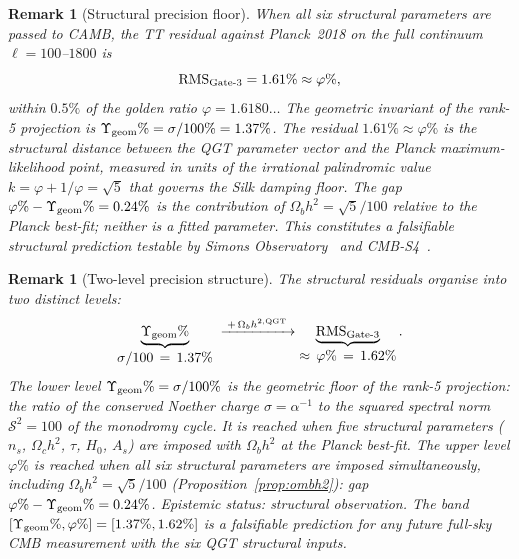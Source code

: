 \documentclass[twocolumn,10pt]{article}
\newcommand{\vp}{\varphi}
\newtheorem{remark}[theorem]{Remark}
\begin{document}
\begin{remark}[Structural precision floor]
\label{rem:rms_upsilon}
When all six structural parameters are passed to CAMB, the TT
residual against Planck~2018 on the full continuum $\ell=100$--$1800$ is
\begin{equation}
  \mathrm{RMS}_{\rm Gate\text{-}3} = 1.61\%
  \approx \vp\%,
  \label{eq:rms_upsilon}
\end{equation}
within $0.5\%$ of the golden ratio $\vp=1.6180\ldots$
The geometric invariant of the rank-5 projection is
$\Upsilon_{\rm geom}\%=\sigma/100\%=1.37\%$.
The residual $1.61\% \approx \vp\%$ is the structural distance
between the QGT parameter vector and the Planck maximum-likelihood
point, measured in units of the irrational palindromic value
$k=\vp+1/\vp=\sqrt{5}$ that governs the Silk damping floor.
The gap $\vp\%-\Upsilon_{\rm geom}\%=0.24\%$ is the contribution
of $\Omega_bh^2=\sqrt{5}/100$ relative to the Planck best-fit;
neither is a fitted parameter.
This constitutes a falsifiable structural prediction testable
by Simons Observatory~\cite{SO2019} and CMB-S4~\cite{CMBS4}.
\end{remark}

\clearpage
\onecolumn

\begin{remark}[Two-level precision structure]
\label{rem:two_levels}
The structural residuals organise into two distinct levels:
\begin{equation}
  \underbrace{\Upsilon_{\rm geom}\%}_{\displaystyle\sigma/100\,=\,1.37\%}
  \;\xrightarrow{\;+\,\Omega_bh^{2,{\rm QGT}}\;}
  \underbrace{\mathrm{RMS}_{\rm Gate\text{-}3}}_{\displaystyle\approx\,\vp\%\,=\,1.62\%}.
  \label{eq:two_levels}
\end{equation}
The lower level $\Upsilon_{\rm geom}\%=\sigma/100\%$ is the geometric
floor of the rank-5 projection: the ratio of the conserved Noether
charge $\sigma=\alpha^{-1}$ to the squared spectral norm
$\mathcal{S}^2=100$ of the monodromy cycle.
It is reached when five structural parameters
($n_s$, $\Omega_ch^2$, $\tau$, $H_0$, $A_s$) are imposed with
$\Omega_bh^2$ at the Planck best-fit.
The upper level $\vp\%$ is reached when all six structural
parameters are imposed simultaneously, including
$\Omega_bh^2=\sqrt{5}/100$ (Proposition~\ref{prop:ombh2}):
gap $\vp\%-\Upsilon_{\rm geom}\%=0.24\%$.
\textit{Epistemic status: structural observation.}
The band $[\Upsilon_{\rm geom}\%,\vp\%]=[1.37\%,1.62\%]$
is a falsifiable prediction for any future full-sky CMB measurement
with the six QGT structural inputs.
\end{remark}
\end{document}
